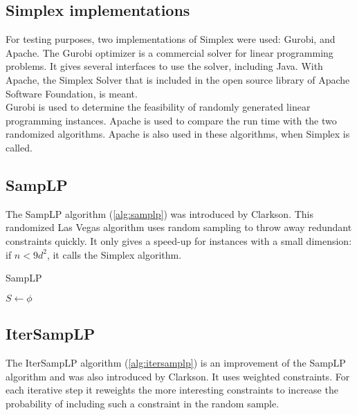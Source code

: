 \documentclass[nocopyrightspace]{acm_proc_article-sp}
\begin{document}
                         

\subsection{Simplex implementations}
For testing purposes, two implementations of Simplex were used: Gurobi, and Apache. The Gurobi optimizer is a commercial solver for linear programming problems. It gives several interfaces to use the solver, including Java. With Apache, the Simplex Solver that is included in the open source library of Apache Software Foundation, is meant.\\
Gurobi is used to determine the feasibility of randomly generated linear programming instances. Apache is used to compare the run time with the two randomized algorithms. Apache is also used in these algorithms, when Simplex is called.

\subsection{SampLP}
The SampLP algorithm (\ref{alg:samplp}) was introduced by Clarkson\cite{clarkson1988vegas}. This randomized Las Vegas algorithm uses random sampling to throw away redundant constraints quickly. It only gives a speed-up for instances with a small dimension: if $n<9d^2$, it calls the Simplex algorithm. 


\begin{algorithm}[h]
\label{alg:samplp}
\caption{SampLP}
$S \gets \phi$\;
\end{algorithm}

\subsection{IterSampLP}
The IterSampLP algorithm (\ref{alg:itersamplp}) is an improvement of the SampLP algorithm and was also introduced by Clarkson\cite{clarkson1995vegas}. It uses weighted constraints. For each iterative step it reweights the more interesting constraints to increase the probability of including such a constraint in the random sample.
\end{document}
